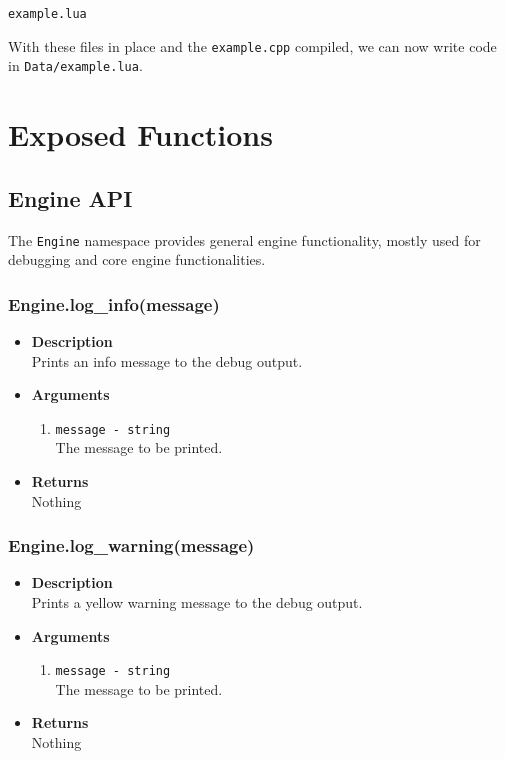\documentclass[12pt,a4paper]{article}
\begin{document}
\begin{lstlisting}[title=Data/res.list]
example.lua
\end{lstlisting}

With these files in place and the \texttt{example.cpp} compiled, we can now write code in \texttt{Data/example.lua}.

\pagebreak
\section{Exposed Functions}

\subsection{Engine API}

The \texttt{Engine} namespace provides general engine functionality, mostly used for debugging and core engine functionalities.


\subsubsection{Engine.log\_info(message)}
\begin{itemize}
	\item[]{\bf Description}
		\\ Prints an info message to the debug output.
	\item[]{\bf Arguments}
	\begin{enumerate}
		\item{\texttt{message - string}} 
			\\ The message to be printed.
	\end{enumerate}
	\item[]{\bf Returns}
		\\ Nothing
\end{itemize}

\subsubsection{Engine.log\_warning(message)}
\begin{itemize}
	\item[]{\bf Description}
		\\ Prints a yellow warning message to the debug output.
	\item[]{\bf Arguments}
	\begin{enumerate}
		\item{\texttt{message - string}} 
			\\ The message to be printed.
	\end{enumerate}
	\item[]{\bf Returns}
		\\ Nothing
\end{itemize}
\end{document}
